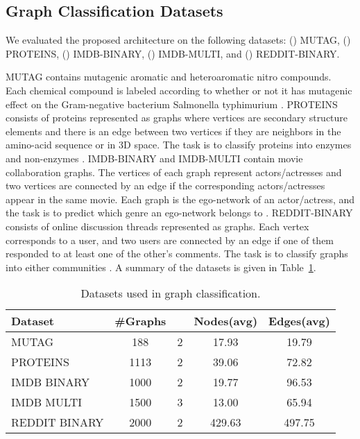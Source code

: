 \documentclass[twoside]{article}
\begin{document}
\subsection{Graph Classification Datasets}
We evaluated the proposed architecture on the following  datasets: ()  MUTAG, () PROTEINS, () IMDB-BINARY, () IMDB-MULTI, and () REDDIT-BINARY.

MUTAG contains mutagenic aromatic and heteroaromatic nitro compounds.
Each chemical compound is labeled according to whether or not it has mutagenic effect on the Gram-negative bacterium Salmonella typhimurium \citep{debnath1991structure}.
PROTEINS consists of proteins represented as graphs where vertices are secondary structure elements and there is an edge between two vertices if they are neighbors in the amino-acid sequence or in 3D space.
The task is to classify proteins into enzymes and non-enzymes \citep{borgwardt2005protein}.
IMDB-BINARY and IMDB-MULTI contain movie collaboration graphs.
The vertices of each graph represent actors/actresses and two vertices are connected by an edge if the corresponding actors/actresses appear in the same movie.
Each graph is the ego-network of an actor/actress, and the task is to predict which genre an ego-network belongs to \citep{yanardag2015deep}.
REDDIT-BINARY consists of online discussion threads represented as graphs.
Each vertex corresponds to a user, and two users are connected by an edge if one of them responded to at least one of the other's comments.
The task is to classify graphs into either communities \citep{yanardag2015deep}.
A summary of the datasets is given in Table~\ref{tab:datasets_graph_classification}.

\begin{table}[t]
\centering
\caption{Datasets used in graph classification.}
\resizebox{\columnwidth}{!} {
\begin{tabular}{lcccc}
\toprule
 Dataset & \#Graphs &  & Nodes(avg) & Edges(avg) \\
\midrule
MUTAG & 188 & 2 & 17.93 & 19.79 \\
PROTEINS & 1113 & 2 & 39.06 & 72.82 \\
IMDB BINARY & 1000 & 2 & 19.77 & 96.53 \\
IMDB MULTI & 1500 & 3 & 13.00 & 65.94 \\
REDDIT BINARY & 2000 & 2 & 429.63 & 497.75 \\
\bottomrule
\end{tabular}
}
\label{tab:datasets_graph_classification}
\end{table}
\end{document}
